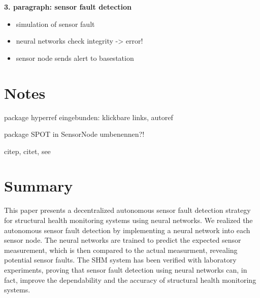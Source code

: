 \documentclass[12pt,a4paper]{scrartcl}
\begin{document}
\textbf{3. paragraph: sensor fault detection}

\begin{itemize}
\item simulation of sensor fault
\item neural networks check integrity -> error!
\item sensor node sends alert to basestation
\end{itemize}


\section*{Notes}

package hyperref eingebunden: klickbare links, autoref

package SPOT in SensorNode umbenennen?!

citep, citet, see

\section*{Summary}

This paper presents a decentralized autonomous sensor fault detection strategy for structural health monitoring systems using neural networks. 
We realized the autonomous sensor fault detection by implementing a neural network into each sensor node.
The neural networks are trained to predict the expected sensor measurement, which is then compared to the actual measurment, revealing potential sensor faults.
The SHM system has been verified with laboratory experiments, proving that sensor fault detection using neural networks can, in fact, improve the dependability and the accuracy of structural health monitoring systems.




\end{document}

